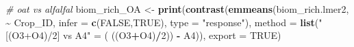 \documentclass[
]{article}
\newenvironment{Shaded}{\begin{snugshade}}{\end{snugshade}}
\newcommand{\AttributeTok}[1]{\textcolor[rgb]{0.13,0.29,0.53}{#1}}
\newcommand{\CommentTok}[1]{\textcolor[rgb]{0.56,0.35,0.01}{\textit{#1}}}
\newcommand{\ConstantTok}[1]{\textcolor[rgb]{0.56,0.35,0.01}{#1}}
\newcommand{\DecValTok}[1]{\textcolor[rgb]{0.00,0.00,0.81}{#1}}
\newcommand{\FunctionTok}[1]{\textcolor[rgb]{0.13,0.29,0.53}{\textbf{#1}}}
\newcommand{\NormalTok}[1]{#1}
\newcommand{\OtherTok}[1]{\textcolor[rgb]{0.56,0.35,0.01}{#1}}
\newcommand{\SpecialCharTok}[1]{\textcolor[rgb]{0.81,0.36,0.00}{\textbf{#1}}}
\newcommand{\StringTok}[1]{\textcolor[rgb]{0.31,0.60,0.02}{#1}}
\begin{document}
\begin{Shaded}
\begin{Highlighting}[]
\CommentTok{\# oat vs alfalfal}
\NormalTok{biom\_rich\_OA }\OtherTok{\textless{}{-}} \FunctionTok{print}\NormalTok{(}\FunctionTok{contrast}\NormalTok{(}\FunctionTok{emmeans}\NormalTok{(biom\_rich.lmer2, }\SpecialCharTok{\textasciitilde{}}\NormalTok{ Crop\_ID,}
                                       \AttributeTok{infer =} \FunctionTok{c}\NormalTok{(}\ConstantTok{FALSE}\NormalTok{,}\ConstantTok{TRUE}\NormalTok{), }
                                       \AttributeTok{type =} \StringTok{"response"}\NormalTok{), }
                               \AttributeTok{method =} \FunctionTok{list}\NormalTok{(}\StringTok{"[(O3+O4)/2] vs A4"} \OtherTok{=}\NormalTok{ ( ((O3}\SpecialCharTok{+}\NormalTok{O4)}\SpecialCharTok{/}\DecValTok{2}\NormalTok{)) }\SpecialCharTok{{-}}\NormalTok{ A4)),}
                      \AttributeTok{export =} \ConstantTok{TRUE}\NormalTok{)}
\end{Highlighting}
\end{Shaded}
\end{document}
